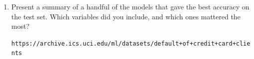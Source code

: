\documentclass[12pt]{book}
\theoremstyle{definition}
\begin{document}
\begin{enumerate}
\item
Present a summary of a handful of the models that gave the best accuracy on the test set.  Which variables did you include, and which ones mattered the most?




\texttt{https://archive.ics.uci.edu/ml/datasets/default+of+credit+card+clients}

\end{enumerate}
\end{document}
